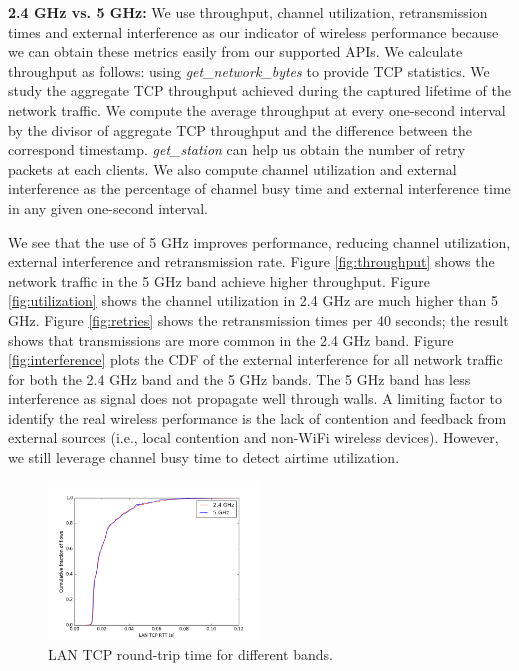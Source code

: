 \textbf{2.4 GHz vs. 5 GHz:} We use throughput, channel utilization, retransmission times and external interference as our indicator of wireless performance because we can obtain these metrics easily from our supported APIs. We calculate throughput as follows: using \textit{get\_network\_bytes} to provide TCP statistics. We study the aggregate TCP throughput achieved during the captured lifetime of the network traffic. We compute the average throughput at every one-second interval by the divisor of aggregate TCP throughput and the difference between the correspond timestamp. \textit{get\_station} can help us obtain the number of retry packets at each clients. We also compute channel utilization and external interference as the percentage of channel busy time and external interference time in any given one-second interval. 

We see that the use of 5 GHz improves performance, reducing channel utilization, external interference and retransmission rate. Figure \ref{fig:throughput} shows the network traffic in the 5 GHz band achieve higher throughput. Figure \ref{fig:utilization} shows the channel utilization in 2.4 GHz are much higher than 5 GHz. Figure \ref{fig:retries} shows the retransmission times per 40 seconds; the result shows that transmissions are more common in the 2.4 GHz band. Figure \ref{fig:interference} plots the CDF of the external interference for all network traffic for both the 2.4 GHz band and the 5 GHz bands. The 5 GHz band has less interference as signal does not propagate well through walls. A limiting factor to identify the real wireless performance is the lack of contention and feedback from external sources (i.e., local contention and non-WiFi wireless devices). However, we still leverage channel busy time to detect airtime utilization.

\begin{figure}
\centering
\includegraphics[width=0.5\textwidth]{figure/tcp_rtt.png}
\caption{LAN TCP round-trip time for different bands. } 
\label{fig:tcprtt}
\end{figure}


